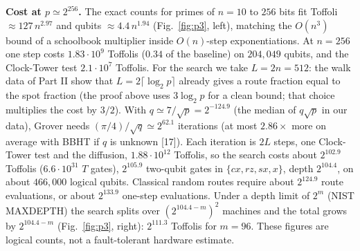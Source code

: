 \documentclass[10pt,a4paper]{article}
\begin{document}
\textbf{Cost at $p\simeq2^{256}$.} The exact counts for primes of $n=10$ to $256$ bits fit Toffoli $\approx127\,n^{2.97}$ and qubits $\approx4.4\,n^{1.94}$ (Fig.~\ref{fig:p3}, left), matching the $O(n^3)$ bound of a schoolbook multiplier inside $O(n)$-step exponentiations. At $n=256$ one step costs $1.83\cdot10^9$ Toffolis ($0.34$ of the baseline) on $204{,}049$ qubits, and the Clock-Tower test $2.1\cdot10^7$ Toffolis. For the search we take $L=2n=512$: the walk data of Part II show that $L=2\lceil\log_2p\rceil$ already gives a route fraction equal to the spot fraction (the proof above uses $3\log_2p$ for a clean bound; that choice multiplies the cost by $3/2$). With $q\simeq7/\sqrt p=2^{-124.9}$ (the median of $q\sqrt p$ in our data), Grover needs $(\pi/4)/\sqrt q\simeq2^{62.1}$ iterations (at most $2.86\times$ more on average with BBHT if $q$ is unknown [17]). Each iteration is $2L$ steps, one Clock-Tower test and the diffusion, $1.88\cdot10^{12}$ Toffolis, so the search costs about $2^{102.9}$ Toffolis ($6.6\cdot10^{31}$ $T$ gates), $2^{105.9}$ two-qubit gates in $\{cx,rz,sx,x\}$, depth $2^{104.4}$, on about $466{,}000$ logical qubits. Classical random routes require about $2^{124.9}$ route evaluations, or about $2^{133.9}$ one-step evaluations. Under a depth limit of $2^{m}$ (NIST MAXDEPTH) the search splits over $(2^{104.4-m})^2$ machines and the total grows by $2^{104.4-m}$ (Fig.~\ref{fig:p3}, right): $2^{111.3}$ Toffolis for $m=96$. These figures are logical counts, not a fault-tolerant hardware estimate.
\end{document}
